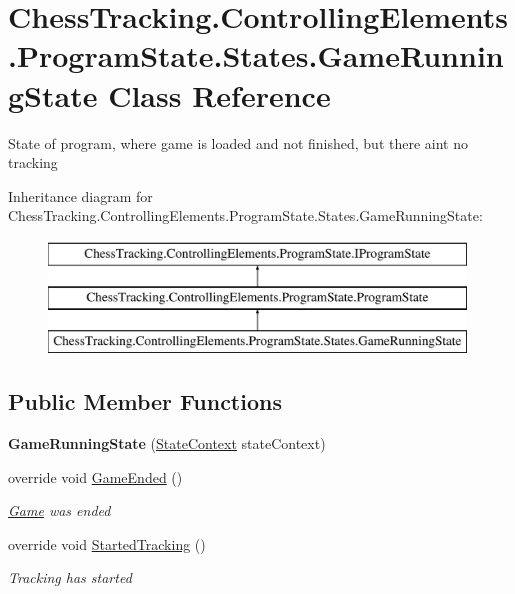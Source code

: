 \hypertarget{class_chess_tracking_1_1_controlling_elements_1_1_program_state_1_1_states_1_1_game_running_state}{}\section{Chess\+Tracking.\+Controlling\+Elements.\+Program\+State.\+States.\+Game\+Running\+State Class Reference}
\label{class_chess_tracking_1_1_controlling_elements_1_1_program_state_1_1_states_1_1_game_running_state}


State of program, where game is loaded and not finished, but there ain\textquotesingle{}t no tracking  


Inheritance diagram for Chess\+Tracking.\+Controlling\+Elements.\+Program\+State.\+States.\+Game\+Running\+State\+:\begin{figure}[H]
\begin{center}
\leavevmode
\includegraphics[height=3.000000cm]{class_chess_tracking_1_1_controlling_elements_1_1_program_state_1_1_states_1_1_game_running_state}
\end{center}
\end{figure}
\subsection*{Public Member Functions}
\begin{DoxyCompactItemize}
\item 
\mbox{\label{class_chess_tracking_1_1_controlling_elements_1_1_program_state_1_1_states_1_1_game_running_state_ad51ef7933559d76549d9f7780bc34a1e}} 
{\bfseries Game\+Running\+State} (\mbox{\hyperlink{class_chess_tracking_1_1_controlling_elements_1_1_program_state_1_1_state_context}{State\+Context}} state\+Context)
\item 
override void \mbox{\hyperlink{class_chess_tracking_1_1_controlling_elements_1_1_program_state_1_1_states_1_1_game_running_state_a716f8029e51162d10d89e1a81c97bb32}{Game\+Ended}} ()
\begin{DoxyCompactList}\small\item\em \mbox{\hyperlink{namespace_chess_tracking_1_1_game}{Game}} was ended \end{DoxyCompactList}\item 
override void \mbox{\hyperlink{class_chess_tracking_1_1_controlling_elements_1_1_program_state_1_1_states_1_1_game_running_state_aa540a4f9c96114762fe08925d7cdc6de}{Started\+Tracking}} ()
\begin{DoxyCompactList}\small\item\em Tracking has started \end{DoxyCompactList}\end{DoxyCompactItemize}
